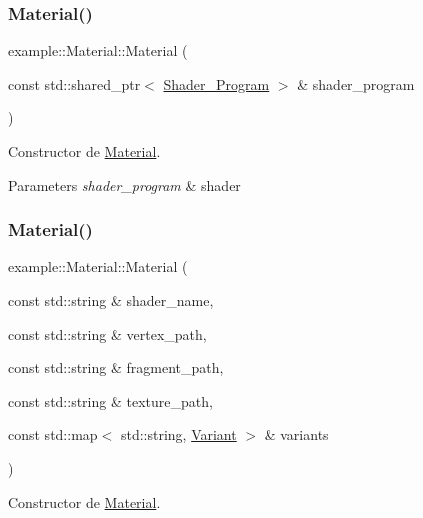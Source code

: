 \subsubsection{\texorpdfstring{Material()}{Material()}\hspace{0.1cm}{\footnotesize\ttfamily [1/2]}}
{\footnotesize\ttfamily example\+::\+Material\+::\+Material (\begin{DoxyParamCaption}\item[{const std\+::shared\+\_\+ptr$<$ \mbox{\hyperlink{classexample_1_1_shader___program}{Shader\+\_\+\+Program}} $>$ \&}]{shader\+\_\+program }\end{DoxyParamCaption})\hspace{0.3cm}{\ttfamily [inline]}}



Constructor de \mbox{\hyperlink{classexample_1_1_material}{Material}}. 


\begin{DoxyParams}{Parameters}
{\em shader\+\_\+program} & shader \\
\hline
\end{DoxyParams}
\mbox{\label{classexample_1_1_material_a7d1c4c3f80caae091c5a1112f992dbec}} 
\subsubsection{\texorpdfstring{Material()}{Material()}\hspace{0.1cm}{\footnotesize\ttfamily [2/2]}}
{\footnotesize\ttfamily example\+::\+Material\+::\+Material (\begin{DoxyParamCaption}\item[{const std\+::string \&}]{shader\+\_\+name,  }\item[{const std\+::string \&}]{vertex\+\_\+path,  }\item[{const std\+::string \&}]{fragment\+\_\+path,  }\item[{const std\+::string \&}]{texture\+\_\+path,  }\item[{const std\+::map$<$ std\+::string, \mbox{\hyperlink{structexample_1_1_variant}{Variant}} $>$ \&}]{variants }\end{DoxyParamCaption})}



Constructor de \mbox{\hyperlink{classexample_1_1_material}{Material}}. 


